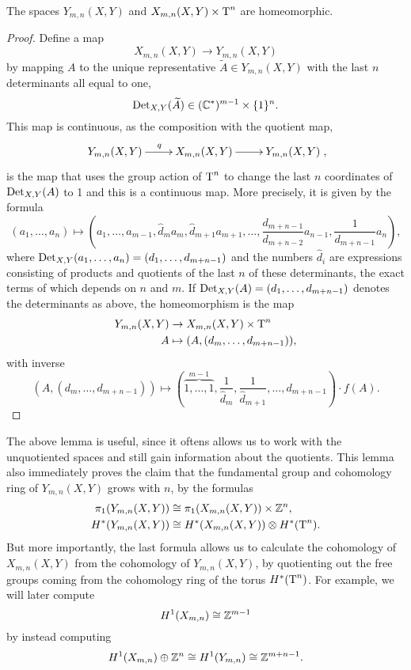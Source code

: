 \begin{lemma}
  \label{lem:reduktion}
  The spaces $Y_{m,n}(X,Y)$ and $X_{m,n}(X,Y) \times \operatorname{T}^n$ are
  homeomorphic.
\end{lemma}
\begin{proof}
  Define a map
  \[ X_{m,n}(X,Y) \to Y_{m,n}(X,Y) \]
  by mapping $A$ to the unique representative
  $\widetilde{A} \in Y_{m,n}(X,Y)$ with the last
  $n$ determinants all equal to one,
  \[ \operatorname{Det}_{X,Y}(\widetilde{A}) \in (\mathbb{C}^*)^{m-1} \times
  \{1\}^n. \]
  This map is continuous, as the composition with the quotient map,
  \[ \xymatrix{Y_{m,n}(X,Y) \ar[r]^q & X_{m,n}(X,Y) \ar[r] &
    Y_{m,n}(X,Y)}, \]
  is the map that uses the group action of $\operatorname{T}^n$ to change the last
  $n$ coordinates of $\operatorname{Det}_{X,Y}(A)$ to 1 and this is a continuous
  map. More precisely, it is given by the formula
  \[ (a_1,\dots,a_n) \mapsto \left(a_1,\dots,a_{m-1},\widehat{d}_ma_m,
    \widehat{d}_{m+1} a_{m+1},\dots,
    \frac{d_{m+n-1}}{d_{m+n-2}}a_{n-1}, \frac{1}{d_{m+n-1}}a_n\right), \]
  where $\operatorname{Det}_{X,Y}(a_1,\dots,a_n) = (d_1,\dots,d_{m+n-1})$ and the
  numbers $\widehat{d}_i$ are expressions consisting of products and
  quotients of the last $n$ of these
  determinants, the exact terms of which depends on $n$ and $m$. If
  $\operatorname{Det}_{X,Y}(A) = (d_1,\dots,d_{m+n-1})$ denotes the determinants as
  above, the homeomorphism is the map
  \begin{align*}
    Y_{m,n}(X,Y) &\to X_{m,n}(X,Y) \times \operatorname{T}^n\\
    A &\mapsto (A, (d_m,\dots,d_{m+n-1})),
  \end{align*}
  with inverse
  \[ (A, (d_m,\dots, d_{m+n-1})) \mapsto
  \left(\overbrace{1,\dots,1}^{m-1}, \frac{1}{\widehat{d}_m},
    \frac{1}{\widehat{d}_{m+1}},\dots,
    d_{m+n-1}\right) \cdot f(A). \] 
\end{proof}

The above lemma is useful, since it oftens allows us to work with the
unquotiented spaces and still gain information about the
quotients.
This lemma also immediately proves the claim that the fundamental
group and cohomology ring of $Y_{m,n}(X,Y)$ grows with $n$, by the
formulas
\begin{align*}
  \pi_1(Y_{m,n}(X,Y)) &\cong \pi_1(X_{m,n}(X,Y)) \times \mathbb{Z}^n, \\
  H^*(Y_{m,n}(X,Y)) &\cong H^*(X_{m,n}(X,Y)) \otimes H^*(\operatorname{T}^n).
\end{align*}
But more importantly, the last formula allows us to calculate the
cohomology of $X_{m,n}(X,Y)$ from the cohomology of $Y_{m,n}(X,Y)$, by
quotienting out the free groups coming from the cohomology ring of the
torus $H^*(\operatorname{T}^n)$. For example, we will later compute 
\[ H^1(X_{m,n}) \cong \mathbb{Z}^{m-1} \]
by instead computing
\[ H^1(X_{m,n}) \oplus \mathbb{Z}^n \cong H^1(Y_{m,n}) \cong \mathbb{Z}^{m+n-1}. \]

